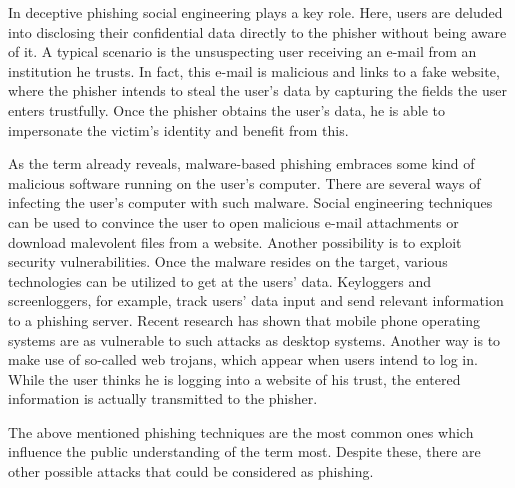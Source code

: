 \begin{description}[leftmargin=0cm]
	\item[Deceptive Phishing:] In deceptive phishing social engineering plays a key role.
 Here, users are deluded into disclosing their confidential data directly to the phisher without being aware of it.
 A typical scenario is the unsuspecting user receiving an e-mail from an institution he trusts.
 In fact, this e-mail is malicious and links to a fake website, where the phisher intends to steal the user's data by capturing the fields the user enters trustfully.
 Once the phisher obtains the user's data, he is able to impersonate the victim's identity and benefit from this.

	\item[Malware Based Phishing:] As the term already reveals, malware-based phishing embraces some kind of malicious software running on the user's computer.
 There are several ways of infecting the user's computer with such malware.
 Social engineering techniques can be used to convince the user to open malicious e-mail attachments or download malevolent files from a website.
 Another possibility is to exploit security vulnerabilities.
 Once the malware resides on the target, various technologies can be utilized to get at the users' data.
 Keyloggers and screenloggers, for example, track users' data input and send relevant information to a phishing server.
 Recent research has shown that mobile phone operating systems are as vulnerable to such attacks as desktop systems.
 Another way is to make use of so-called web trojans, which appear when users intend to log in.
 While the user thinks he is logging into a website of his trust, the entered information is actually transmitted to the phisher.

\end{description}
The above mentioned phishing techniques are the most common ones which influence the public understanding of the term most.
Despite these, there are other possible attacks that could be considered as phishing.

